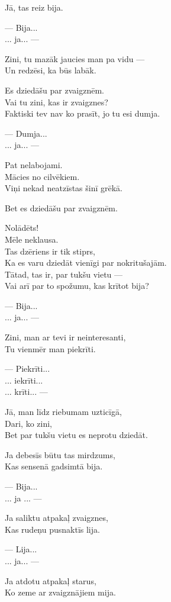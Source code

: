 \documentclass[14pt]{extarticle}
\begin{document}
Jā, tas reiz bija.

--- Bija...\\
... ja... ---

Zini, tu mazāk jaucies man pa vidu ---\\
Un redzēsi, ka būs labāk.

Es dziedāšu par zvaigznēm.\\
Vai tu zini, kas ir zvaigznes?\\
Faktiski tev nav ko prasīt, jo tu esi dumja.

--- Dumja...\\
... ja... ---

Pat nelabojami.\\
Mācies no cilvēkiem.\\
Viņi nekad neatzīstas šinī grēkā.

Bet es dziedāšu par zvaigznēm.

Nolādēts!\\
Mēle neklausa.\\
Tas dzēriens ir tik stiprs,\\
Ka es varu dziedāt vienīgi par nokritušajām.\\
Tātad, tas ir, par tukšu vietu ---\\
Vai arī par to spožumu, kas krītot bija?

--- Bija...\\
... ja... ---

Zini, man ar tevi ir neinteresanti,\\
Tu vienmēr man piekrīti.

--- Piekrīti...\\
... iekrīti...\\
... krīti... ---

Jā, man līdz riebumam uzticīgā,\\
Dari, ko zini,\\
Bet par tukšu vietu es neprotu dziedāt.

Ja debesīs būtu tas mirdzums,\\
Kas sensenā gadsimtā bija.

--- Bija...\\
... ja ... ---

Ja saliktu atpakaļ zvaigznes,\\
Kas rudeņu pusnaktīs lija.

--- Lija...\\
... ja... ---

Ja atdotu atpakaļ starus,\\
Ko zeme ar zvaigznājiem mija.
\end{document}
